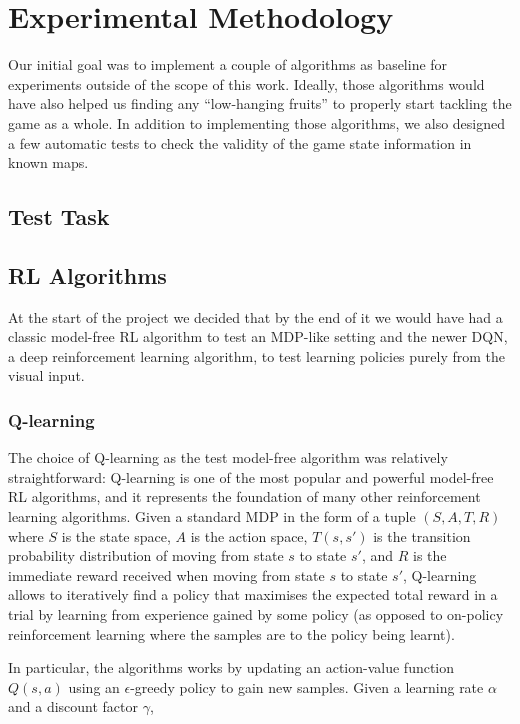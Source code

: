 \chapter{Experimental Methodology} 

Our initial goal was to implement a couple of algorithms as baseline for
experiments outside of the scope of this work. Ideally, those algorithms would
have also helped us finding any ``low-hanging fruits'' to properly start
tackling the game as a whole. In addition to implementing those algorithms, we
also designed a few automatic tests to check the validity of the game state
information in known maps.  

\section{Test Task}

\section{RL Algorithms}

At the start of the project we decided that by the end of it we would have had a
classic model-free RL algorithm to test an MDP-like setting and the newer DQN, a
deep reinforcement learning algorithm, to test learning policies purely from the
visual input. 

\subsection{Q-learning}

The choice of Q-learning as the test model-free algorithm was relatively
straightforward: Q-learning is one of the most popular and powerful model-free
RL algorithms, and it represents the foundation of many other reinforcement
learning algorithms. Given a standard MDP in the form of a tuple $(S, A, T, R)$
where $S$ is the state space, $A$ is the action space, $T(s, s')$ is the
transition probability distribution of moving from state $s$ to state $s'$, and
$R$ is the immediate reward received when moving from state $s$ to state $s'$,
Q-learning allows to iteratively find a policy that maximises the expected total
reward in a trial by learning from experience gained by some policy (as opposed
to on-policy reinforcement learning where the samples are  to the
policy being learnt).

In particular, the algorithms works by updating an action-value function $Q(s,
a)$ using an $\epsilon$-greedy policy to gain new samples. Given a learning rate
$\alpha$ and a discount factor $\gamma$,


